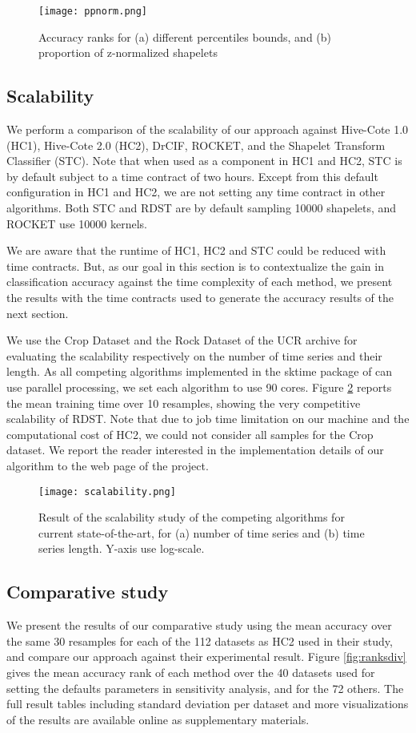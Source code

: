 \begin{figure}[h]
  \texttt{[image: ppnorm.png]}
  \centering
  \caption{Accuracy ranks for (a) different percentiles bounds, and (b) proportion of z-normalized shapelets}
  \label{fig:sensi_bound_pnorm}
\end{figure}

\subsection{Scalability}
We perform a comparison of the scalability of our approach against Hive-Cote 1.0 (HC1), Hive-Cote 2.0 (HC2), DrCIF, ROCKET, and the Shapelet Transform Classifier (STC). Note that when used as a component in HC1 and HC2, STC is by default subject to a time contract of two hours. Except from this default configuration in HC1 and HC2, we are not setting any time contract in other algorithms. Both STC and RDST are by default sampling 10000 shapelets, and ROCKET use 10000 kernels.

We are aware that the runtime of HC1, HC2 and STC could be reduced with time contracts. But, as our goal in this section is to contextualize the gain in classification accuracy against the time complexity of each method, we present the results with the time contracts used to generate the accuracy results of the next section.

We use the Crop Dataset and the Rock Dataset of the UCR archive for evaluating the scalability respectively on the number of time series and their length. As all competing algorithms implemented in the sktime package of \cite{sktime} can use parallel processing, we set each algorithm to use 90 cores. Figure \ref{fig:scal} reports the mean training time over 10 resamples, showing the very competitive scalability of RDST. Note that due to job time limitation on our machine and the computational cost of HC2, we could not consider all samples for the Crop dataset. We report the reader interested in the implementation details of our algorithm to the web page of the project.

\begin{figure}[h]
  \texttt{[image: scalability.png]}
  \centering
  \caption{Result of the scalability study of the competing algorithms for current state-of-the-art, for (a) number of time series and (b) time series length. Y-axis use log-scale.}
  \label{fig:scal}
\end{figure}

\subsection{Comparative study}
We present the results of our comparative study using the mean accuracy over the same 30 resamples for each of the 112 datasets as HC2 \cite{HC2} used in their study, and compare our approach against their experimental result. Figure \ref{fig:ranksdiv} gives the mean accuracy rank of each method over the 40 datasets used for setting the defaults parameters in sensitivity analysis, and for the 72 others. The full result tables including standard deviation per dataset and more visualizations of the results are available online as supplementary materials. 

